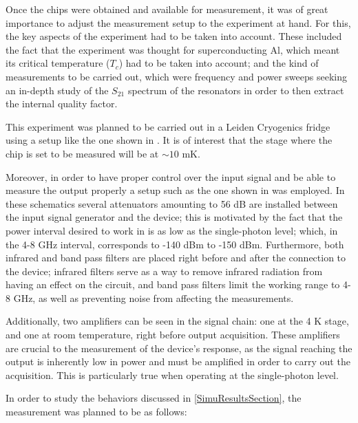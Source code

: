 \documentclass[12pt, a4paper]{article}
\begin{document}
Once the chips were obtained and available for measurement, it was of great importance to adjust the measurement setup to the experiment at hand. For this, the key aspects of the experiment had to be taken into account. These included the fact that the experiment was thought for superconducting Al, which meant its critical temperature ($T_c$) had to be taken into account; and the kind of measurements to be carried out, which were frequency and power sweeps seeking an in-depth study of the $S_{21}$ spectrum of the resonators in order to then extract the internal quality factor.

This experiment was planned to be carried out in a Leiden Cryogenics fridge using a setup like the one shown in \cite{LopezNunez2024}. It is of interest that the stage where the chip is set to be measured will be at $\sim 10$ mK.

Moreover, in order to have proper control over the input signal and be able to measure the output properly a setup such as the one shown in \cite{LopezNunez2024} was employed. In these schematics several attenuators amounting to 56 dB are installed between the input signal generator and the device; this is motivated by the fact that the power interval desired to work in is as low as the single-photon level; which, in the 4-8 GHz interval, corresponds to -140 dBm to -150 dBm. Furthermore, both infrared and band pass filters are placed right before and after the connection to the device; infrared filters serve as a way to remove infrared radiation from having an effect on the circuit, and band pass filters limit the working range to 4-8 GHz, as well as preventing noise from affecting the measurements.

Additionally, two amplifiers can be seen in the signal chain: one at the 4 K stage, and one at room temperature, right before output acquisition. These amplifiers are crucial to the measurement of the device's response, as the signal reaching the output is inherently low in power and must be amplified in order to carry out the acquisition. This is particularly true when operating at the single-photon level.

In order to study the behaviors discussed in \cref{SimuResultsSection}, the measurement was planned to be as follows:
\end{document}
